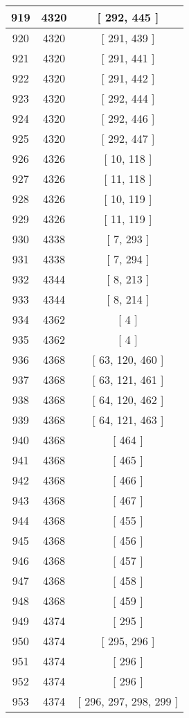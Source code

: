 \begin{center}
\begin{longtable}[H]{|| c c c ||}
\hline
919 & 4320 & [ 292, 445 ] \\ 
\hline
920 & 4320 & [ 291, 439 ] \\ 
\hline
921 & 4320 & [ 291, 441 ] \\ 
\hline
922 & 4320 & [ 291, 442 ] \\ 
\hline
923 & 4320 & [ 292, 444 ] \\ 
\hline
924 & 4320 & [ 292, 446 ] \\ 
\hline
925 & 4320 & [ 292, 447 ] \\ 
\hline
926 & 4326 & [ 10, 118 ] \\ 
\hline
927 & 4326 & [ 11, 118 ] \\ 
\hline
928 & 4326 & [ 10, 119 ] \\ 
\hline
929 & 4326 & [ 11, 119 ] \\ 
\hline
930 & 4338 & [ 7, 293 ] \\ 
\hline
931 & 4338 & [ 7, 294 ] \\ 
\hline
932 & 4344 & [ 8, 213 ] \\ 
\hline
933 & 4344 & [ 8, 214 ] \\ 
\hline
934 & 4362 & [ 4 ] \\ 
\hline
935 & 4362 & [ 4 ] \\ 
\hline
936 & 4368 & [ 63, 120, 460 ] \\ 
\hline
937 & 4368 & [ 63, 121, 461 ] \\ 
\hline
938 & 4368 & [ 64, 120, 462 ] \\ 
\hline
939 & 4368 & [ 64, 121, 463 ] \\ 
\hline
940 & 4368 & [ 464 ] \\ 
\hline
941 & 4368 & [ 465 ] \\ 
\hline
942 & 4368 & [ 466 ] \\ 
\hline
943 & 4368 & [ 467 ] \\ 
\hline
944 & 4368 & [ 455 ] \\ 
\hline
945 & 4368 & [ 456 ] \\ 
\hline
946 & 4368 & [ 457 ] \\ 
\hline
947 & 4368 & [ 458 ] \\ 
\hline
948 & 4368 & [ 459 ] \\ 
\hline
949 & 4374 & [ 295 ] \\ 
\hline
950 & 4374 & [ 295, 296 ] \\ 
\hline
951 & 4374 & [ 296 ] \\ 
\hline
952 & 4374 & [ 296 ] \\ 
\hline
953 & 4374 & [ 296, 297, 298, 299 ] \\ 

\end{longtable}
\end{center}
